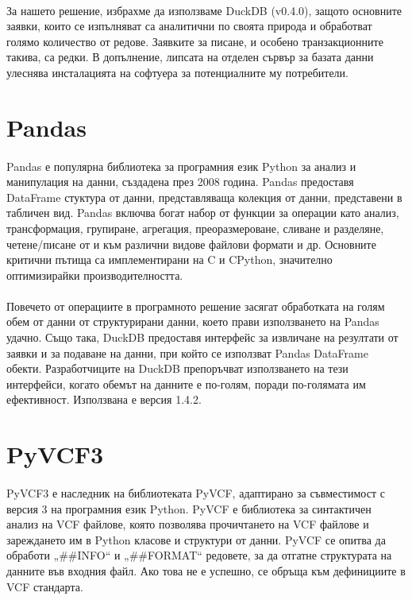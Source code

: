 \documentclass[pdftex,cyrillic,14pt,a4page,twoside,openright]{extreport}
\begin{document}
\paragraph{}
За нашето решение, избрахме да използваме DuckDB (v0.4.0), защото основните заявки, които се изпълняват са аналитични по своята природа и обработват голямо количество от редове. Заявките за писане, и особено транзакционните такива, са редки. В допълнение, липсата на отделен сървър за базата данни улеснява инсталацията на софтуера за потенциалните му потребители.
\section{Pandas}
\paragraph{}
Pandas \cite{reback2020pandas} е популярна библиотека за програмния език Python за анализ и манипулация на данни, създадена през 2008 година. Pandas предоставя DataFrame стуктура от данни, представляваща колекция от данни, представени в табличен вид. Pandas включва богат набор от функции за операции като анализ, трансформация, групиране, агрегация, преоразмероване, сливане и разделяне, четене/писане от и към различни видове файлови формати и др. Основните критични пътища са имплементирани на C и CPython, значително оптимизирайки производителността.

\paragraph{}
Повечето от операциите в програмното решение засягат обработката на голям обем от данни от структурирани данни, което прави използването на Pandas удачно. Също така, DuckDB предоставя интерфейс за извличане на резултати от заявки и за подаване на данни, при който се използват Pandas DataFrame обекти. Разработчиците на DuckDB препоръчват използването на тези интерфейси, когато обемът на данните е по-голям, поради по-голямата им ефективност. Използвана е версия 1.4.2.
\section{PyVCF3}
\paragraph{}
PyVCF3 \cite{pyvcf3} е наследник на библиотеката PyVCF, адаптирано за съвместимост с версия 3 на програмния език Python. PyVCF е библиотека за синтактичен анализ на VCF файлове, която позволява прочичтането на VCF файлове и зареждането им в Python класове и структури от данни. PyVCF се опитва да обработи „\#\#INFO“ и „\#\#FORMAT“ редовете, за да отгатне структурата на данните във входния файл. Ако това не е успешно, се обръща към дефинициите в VCF стандарта.
\end{document}
